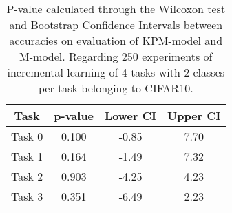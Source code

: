 \begin{table}[H]
\centering
\begin{tabular}{cccc}
\toprule
Task & p-value & Lower CI & Upper CI \\
\midrule
Task 0 & 0.100 &-0.85 & 7.70 \\
Task 1 & 0.164 &-1.49 & 7.32 \\
Task 2 & 0.903 &-4.25 & 4.23 \\
Task 3 & 0.351 &-6.49 & 2.23 \\
\bottomrule
\end{tabular}
\caption{P-value calculated through the Wilcoxon test and Bootstrap Confidence Intervals between accuracies on evaluation of KPM-model and M-model. Regarding 250 experiments of incremental learning of 4 tasks with 2 classes per task belonging to CIFAR10.}
\end{table}
